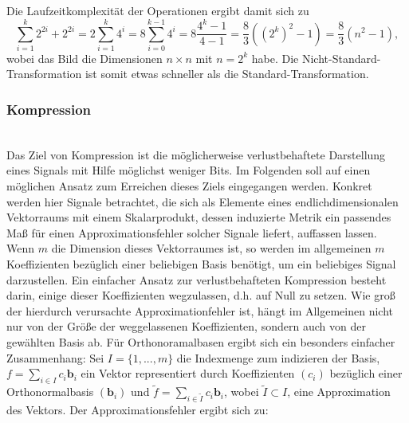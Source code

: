%
Die Laufzeitkomplexität der Operationen ergibt damit sich zu 
%
\[
\sum_{i=1}^k 2^{2i} + 2^{2i} 
= 2\sum_{i=1}^k 4^i 
= 8\sum_{i=0}^{k-1} 4^i 
= 8\frac{4^k-1}{4-1} 
= \frac{8}{3}((2^k)^2-1) 
= \frac{8}{3}(n^2-1) ,
\]
%
wobei das Bild die Dimensionen $n \times n$ mit $n=2^k$ habe. Die Nicht-Standard-Transformation ist somit etwas schneller als die Standard-Transformation.
%
\subsubsection{Kompression}~\\
%
Das Ziel von Kompression ist die möglicherweise verlustbehaftete Darstellung eines Signals mit Hilfe möglichst weniger Bits. Im Folgenden soll auf einen möglichen Ansatz zum Erreichen dieses Ziels eingegangen werden.
Konkret werden hier Signale betrachtet, die sich als Elemente eines endlichdimensionalen Vektorraums mit einem Skalarprodukt, dessen induzierte Metrik ein passendes Maß für einen Approximationsfehler solcher Signale liefert, auffassen lassen. Wenn $m$ die Dimension dieses Vektorraumes ist, so werden im allgemeinen $m$ Koeffizienten bezüglich einer beliebigen Basis benötigt, um ein beliebiges Signal darzustellen. Ein einfacher Ansatz zur verlustbehafteten Kompression besteht darin, einige dieser Koeffizienten wegzulassen, d.h. auf Null zu setzen. Wie groß der hierdurch verursachte Approximationfehler ist, hängt im Allgemeinen nicht nur von der Größe der weggelassenen Koeffizienten, sondern auch von der gewählten Basis ab. Für Orthonoramalbasen ergibt sich ein besonders einfacher Zusammenhang: Sei $I=\{1,...,m\}$ die Indexmenge zum indizieren der Basis, $f=\sum_{i \in I} c_i \mathbf{b}_i$ ein Vektor representiert durch Koeffizienten $(c_i)$ bezüglich einer Orthonormalbasis $(\mathbf{b}_i)$ und $\tilde{f}=\sum_{i \in \tilde{I}} c_i \mathbf{b}_i$, wobei $\tilde{I} \subset I$, eine Approximation des Vektors. Der Approximationsfehler ergibt sich zu:
